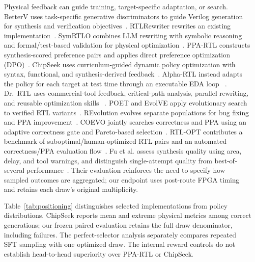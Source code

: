 Physical feedback can guide training, target-specific adaptation, or search.
BetterV uses task-specific generative discriminators to guide Verilog generation
for synthesis and verification objectives~\cite{pei2024betterv}.
RTLRewriter rewrites an existing implementation~\cite{yao2024rtlrewriter}.
SymRTLO combines LLM rewriting with symbolic reasoning and formal/test-based
validation for physical optimization~\cite{wang2025symrtlo}.
PPA-RTL constructs synthesis-scored preference pairs and applies direct
preference optimization (DPO)~\cite{ppartl2025}.  ChipSeek uses curriculum-guided
dynamic policy optimization with syntax, functional, and synthesis-derived
feedback~\cite{chipseek2025}.  Alpha-RTL instead adapts the
policy for each target at test time through an executable EDA loop
~\cite{zhou2026alphartl}.  Dr.~RTL uses commercial-tool feedback, critical-path
analysis, parallel rewriting, and reusable optimization skills
~\cite{drrtl2026}.  POET and EvolVE apply evolutionary search to verified RTL
variants~\cite{poet2026,evolve2026}. REvolution evolves separate populations for
bug fixing and PPA improvement~\cite{min2025revolution}. COEVO jointly searches
correctness and PPA using an adaptive correctness gate and Pareto-based
selection~\cite{coevo2026}. RTL-OPT contributes a benchmark of
suboptimal/human-optimized RTL pairs and an automated correctness/PPA
evaluation flow~\cite{lu2026rtlopt}. Fu et al. assess synthesis quality using
area, delay, and tool warnings, and distinguish single-attempt quality from
best-of-several performance~\cite{fu2026synthesis}. Their evaluation reinforces
the need to specify how sampled outcomes are aggregated; our endpoint uses
post-route FPGA timing and retains each draw's original multiplicity.

Table~\ref{tab:positioning} distinguishes selected implementations from policy
distributions. ChipSeek reports mean and extreme physical metrics among correct
generations; our frozen paired evaluation retains the full draw denominator,
including failures. The perfect-selector analysis separately compares repeated
SFT sampling with one optimized draw. The internal reward controls do not
establish head-to-head superiority over PPA-RTL or ChipSeek.

